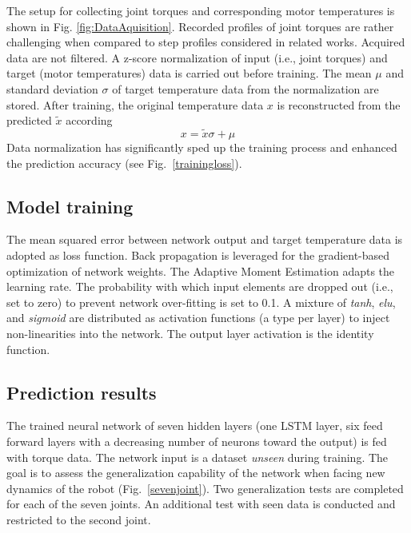 \documentclass{ifacconf}
\begin{document}
The setup for collecting joint torques and corresponding motor temperatures is shown in Fig. \ref{fig:DataAquisition}. Recorded profiles of joint torques are rather challenging when compared to step profiles considered in related works.  Acquired data are not filtered. A z-score normalization of  input (i.e., joint torques) and target (motor temperatures) data is carried out before training. The  mean $\mu$ and standard deviation $\sigma$ of target temperature data from the normalization are stored. After training, the original  temperature data $x$ is reconstructed from the predicted $\tilde{x}$ according
\begin{equation}
	x=\tilde{x}\sigma +\mu
\end{equation}
Data normalization has significantly sped up the training process and enhanced the prediction accuracy (see Fig.~\ref{trainingloss}). 
\subsection{Model training}
The mean squared error between network output and target temperature data  is adopted as loss function. Back propagation is leveraged for the gradient-based optimization of network weights. The Adaptive Moment {Estimation adapts the learning rate.} The probability with which input elements are dropped out (i.e., set to zero) to prevent  network over-fitting is set to 0.1. A mixture of \textit{tanh}, \textit{elu}, and \textit{sigmoid} are distributed as activation functions (a type per layer) to inject non-linearities  into the network. The output layer activation is  {the identity  function.}
\subsection{Prediction results}
The trained neural network of seven hidden layers (one LSTM layer, six feed forward  layers with a decreasing number of neurons toward the output) is fed with torque data. The network input is a  dataset \textit{unseen} during training.  The goal is to  assess the generalization capability of the network when facing new dynamics of the robot (Fig.~\ref{sevenjoint}). Two generalization tests are completed for each of the seven joints.  An additional test with seen data is conducted and restricted to the second joint.
\end{document}
